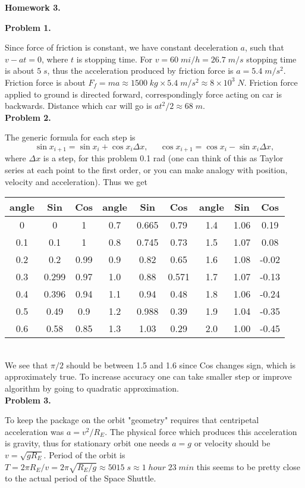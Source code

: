 \documentclass[12pt]{article}
\begin{document}
\begin{center}
{\bf\large Homework 3.}
\end{center}

{\bf Problem 1.}

Since force of friction is constant, we have constant deceleration $a$, such that
$v -at=0$, where $t$ is stopping time. For $v=60\;mi/h=26.7\;m/s$ stopping time is about $5\;s$,
thus the acceleration produced by friction force is $a=5.4\;m/s^2$. Friction force is about
$F_f=ma\approx 1500\;kg\times 5.4\;m/s^2\approx 8\times 10^3 \;N$. Friction force applied to
ground is directed forward, correspondingly force acting on car is backwards.
Distance which car will go is $at^2/2\approx 68\; m$.
\\

{\bf Problem 2.}

The generic formula for each step is
$$\sin x_{i+1}=\sin x_i +\cos x_i \Delta x,\;\;\;\;\; \cos x_{i+1}=\cos x_i -\sin x_i \Delta x,$$
where $\Delta x$ is a step, for this problem 0.1 rad (one can think of this as Taylor series
at each point to the first order, or you can make analogy with position, velocity and acceleration).
Thus we get\\
\begin{tabular}{|c|c|c||c|c|c||c|c|c|}
\hline
angle & Sin &Cos& angle& Sin &Cos &angle&Sin&Cos\\
\hline
0&0&1&0.7&0.665&0.79&1.4&1.06&0.19\\
0.1& 0.1&1&0.8& 0.745&0.73&1.5&1.07&0.08\\
0.2& 0.2&0.99&0.9& 0.82&0.65&1.6&1.08&-0.02\\
0.3& 0.299&0.97&1.0& 0.88&0.571&1.7&1.07&-0.13\\
0.4& 0.396&0.94&1.1& 0.94&0.48&1.8&1.06&-0.24\\
0.5& 0.49&0.9&1.2& 0.988&0.39&1.9&1.04&-0.35\\
0.6& 0.58&0.85&1.3& 1.03&0.29&2.0&1.00&-0.45\\
\hline
\end{tabular}\\
We see that $\pi/2$ should be between 1.5 and 1.6 since Cos changes sign,
which is approximately true. To increase accuracy one can take smaller step or
improve algorithm by going to quadratic approximation.
\\

{\bf Problem 3.}

To keep the package on the orbit "geometry" requires that centripetal
acceleration was $a=v^2/R_{E}$. The physical force which produces this acceleration is 
gravity, thus for stationary orbit one needs $a=g$ or velocity should be $v=\sqrt{g R_{E}}$.
Period of the orbit is $T=2\pi R_{E}/v=2\pi \sqrt{R_{E}/g}\approx 5015\;s\approx 1\;hour\;23\;min$ this seems to be pretty close to the actual period of the Space Shuttle.
\\
\end{document}
